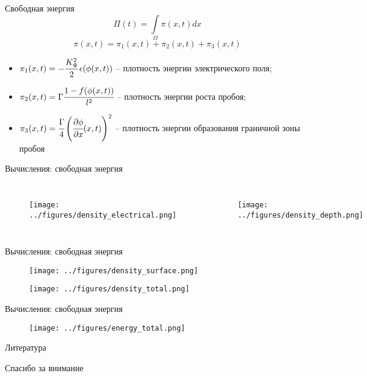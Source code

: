 \documentclass{beamer}
\begin{document}
\begin{frame}{Свободная энергия}
\vspace{-0.5cm}
$$\Pi(t) = \int\limits_\Omega \pi(x, t) dx$$
$$\pi(x, t) = \pi_1(x, t) + \pi_2(x, t) + \pi_3(x, t)$$
\vspace{-0.3cm}
\begin{itemize}
	\item $\pi_1(x, t) = -\cfrac{K_\Phi^2}{2} \, \epsilon(\phi(x, t))$ -- плотность энергии
	электрического поля;
	\item $\pi_2(x, t) = \Gamma \cfrac{1 - f(\phi(x, t))}{l^2}$ -- плотность энергии роста пробоя;
	\item $\pi_3(x, t) = \cfrac{\Gamma}{4} \left( \cfrac{\partial \phi}{\partial x}(x, t)
	\right)^2$ -- плотность энергии образования граничной зоны пробоя
\end{itemize}
\end{frame}


\begin{frame}{Вычисления: свободная энергия}
\begin{columns}
\begin{figure}
	\texttt{[image: ../figures/density\_electrical.png]}
\end{figure}
\begin{figure}
	\texttt{[image: ../figures/density\_depth.png]}
\end{figure}
\end{columns}
\end{frame}


\begin{frame}{Вычисления: свободная энергия}
\vspace{-0.3cm}
\begin{figure}
	\texttt{[image: ../figures/density\_surface.png]}
\end{figure}
\vspace{-0.4cm}
\begin{figure}
	\texttt{[image: ../figures/density\_total.png]}
\end{figure}
\end{frame}


\begin{frame}{Вычисления: свободная энергия}
\begin{figure}
	\texttt{[image: ../figures/energy\_total.png]}
\end{figure}
\end{frame}


\begin{frame}{Литература}
\printbibliography
\end{frame}


\begin{frame}{}
\begin{center}
	\Large
	Спасибо за внимание
\end{center}
\end{frame}
\end{document}
